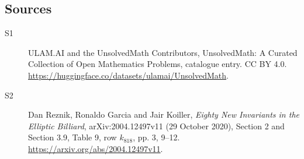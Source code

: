 \documentclass[11pt]{article}
\begin{document}
\subsection{Sources}
\begin{description}
\item[\hypertarget{source:statement:1}{S1}] ULAM.AI and the UnsolvedMath Contributors, UnsolvedMath: A Curated Collection of Open Mathematics Problems, catalogue entry. CC BY 4.0. \url{https://huggingface.co/datasets/ulamai/UnsolvedMath}.
\item[\hypertarget{source:statement:2}{S2}] Dan Reznik, Ronaldo Garcia and Jair Koiller, \emph{Eighty New Invariants in the Elliptic Billiard}, arXiv:2004.12497v11 (29 October 2020), Section 2 and Section 3.9, Table 9, row $k_{818}$, pp. 3, 9--12. \url{https://arxiv.org/abs/2004.12497v11}.
\end{description}
\label{end:statement}
\end{document}
